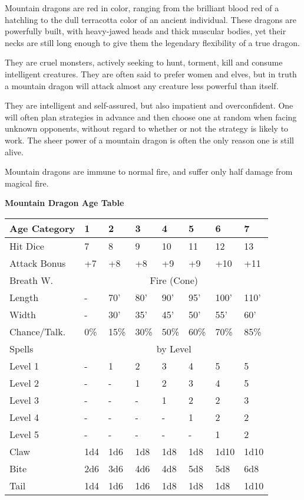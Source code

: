 \documentclass[a4paper,twoside,openany,10pt]{book}
\begin{document}
\begin{multicols}{2}
Mountain dragons are red in color, ranging from the brilliant blood red of a hatchling to the dull terracotta color of an ancient individual. These dragons are powerfully built, with heavy-jawed heads and thick muscular bodies, yet their necks are still long enough to give them the legendary flexibility of a true dragon.

They are cruel monsters, actively seeking to hunt, torment, kill and consume intelligent creatures. They are often said to prefer women and elves, but in truth a mountain dragon will attack almost any creature less powerful than itself.

They are intelligent and self-assured, but also impatient and overconfident. One will often plan strategies in advance and then choose one at random when facing unknown opponents, without regard to whether or not the strategy is likely to work. The sheer power of a mountain dragon is often the only reason one is still alive.

Mountain dragons are immune to normal fire, and suffer only half damage from magical fire.\\

\begin{center}
	\textbf{Mountain Dragon Age Table}\\

\begin{tabularx}{0.47\textwidth}{@{}lXXXXXXX@{}}
Age Category & 1 & 2 & 3 & 4 & 5 & 6 & 7 \\\hline
Hit Dice & 7 & 8 & 9 & 10 & 11 & 12 & 13 \\\hline
Attack Bonus & +7 & +8 & +8 & +9 & +9 & +10 & +11 \\\hline
Breath W. & \multicolumn{7}{c}{Fire (Cone)}\\\hline
Length & - & 70' & 80' & 90' & 95' & 100' & 110' \\\hline
Width & - & 30' & 35' & 45' & 50' & 55' & 60' \\\hline
Chance/Talk. & 0\% & 15\% & 30\% & 50\% & 60\% & 70\% & 85\% \\\hline
Spells &\multicolumn{7}{c}{by Level}\\\hline
Level 1 & - & 1 & 2 & 3 & 4 & 5 & 5 \\\hline
Level 2 & - & - & 1 & 2 & 3 & 4 & 5 \\\hline
Level 3 & - & - & - & 1 & 2 & 2 & 3 \\\hline
Level 4 & - & - & - & - & 1 & 2 & 2 \\\hline
Level 5 & - & - & - & - & - & 1 & 2 \\\hline
Claw & 1d4 & 1d6 & 1d8 & 1d8 & 1d8 & 1d10 & 1d10 \\\hline
Bite & 2d6 & 3d6 & 4d6 & 4d8 & 5d8 & 5d8 & 6d8 \\\hline
Tail & 1d4 & 1d6 & 1d6 & 1d8 & 1d8 & 1d8 & 1d10 \\\hline
\end{tabularx}


\end{center}
\end{multicols}
\end{document}
